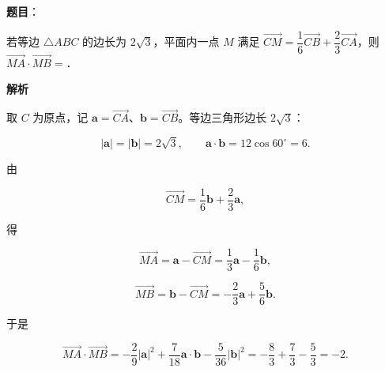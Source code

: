 \begin{answer}

\textbf{题目}：

若等边 $\triangle ABC$ 的边长为 $2\sqrt3$，平面内一点 $M$ 满足 $\overrightarrow{CM}=\dfrac16\overrightarrow{CB}+\dfrac23\overrightarrow{CA}$，则 $\overrightarrow{MA}\cdot\overrightarrow{MB}=$\gkblank{}．

\textbf{解析}

取 $C$ 为原点，记 $\boldsymbol a=\overrightarrow{CA}$、$\boldsymbol b=\overrightarrow{CB}$。等边三角形边长 $2\sqrt3$：

\nopagebreak[4]
\[|\boldsymbol a|=|\boldsymbol b|=2\sqrt3,\qquad
\boldsymbol a\cdot\boldsymbol b=12\cos60^\circ=6 .\]

由

\nopagebreak[4]
\[\overrightarrow{CM}=\frac16\boldsymbol b+\frac23\boldsymbol a,\]

得

\nopagebreak[4]
\[\overrightarrow{MA}=\boldsymbol a-\overrightarrow{CM}=\frac13\boldsymbol a-\frac16\boldsymbol b,\]

\nopagebreak[4]
\[\overrightarrow{MB}=\boldsymbol b-\overrightarrow{CM}=-\frac23\boldsymbol a+\frac56\boldsymbol b .\]

于是

\nopagebreak[4]
\[\overrightarrow{MA}\cdot\overrightarrow{MB}
=-\frac29|\boldsymbol a|^2+\frac7{18}\boldsymbol a\cdot\boldsymbol b-\frac5{36}|\boldsymbol b|^2
=-\frac83+\frac73-\frac53=-2 .\]


\end{answer}
